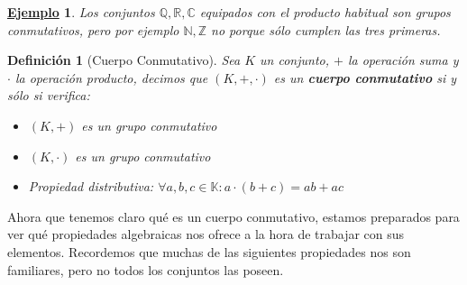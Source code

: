\documentclass[10pt,a4paper,openright]{book}
\theoremstyle{break}
\newtheorem{defi}{Definición}[chapter]
\newtheorem{ej}{\underline{Ejemplo}}[chapter]
\begin{document}
\begin{ej}
Los conjuntos $\mathbb {Q, R, C}$ equipados con el producto habitual son grupos conmutativos, pero por ejemplo $\mathbb {N,Z}$ no porque sólo cumplen las tres primeras.
\end{ej}

\begin{defi}[Cuerpo Conmutativo]
Sea $K$ un conjunto, $+$ la operación suma y $\cdot$ la operación producto, decimos que $(K,+,\cdot)$ es un \textbf{cuerpo conmutativo} si y sólo si verifica:
\begin{itemize}
\item $(K, +)$ es un grupo conmutativo
\item $(K, \cdot)$ es un grupo conmutativo
\item Propiedad distributiva: $\forall a,b,c\in \mathbb K: a\cdot (b+c)=ab+ac$
\end{itemize}
\end{defi}

Ahora que tenemos claro qué es un cuerpo conmutativo, estamos preparados para ver qué propiedades algebraicas nos ofrece a la hora de trabajar con sus elementos. Recordemos que muchas de las siguientes propiedades nos son familiares, pero no todos los conjuntos las poseen.
\end{document}
